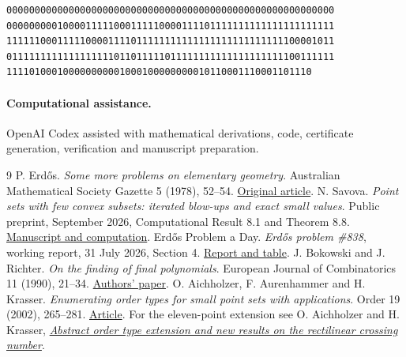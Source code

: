 \documentclass[11pt]{article}
\begin{document}
{\small\begin{verbatim}
0000000000000000000000000000000000000000000000000000000000
0000000001000011111000111110000111101111111111111111111111
1111110001111100001111011111111111111111111111111100001011
0111111111111111111011011111011111111111111111111100111111
111101000100000000001000100000000010110001110001101110
\end{verbatim}}
\paragraph{Computational assistance.} OpenAI Codex assisted with mathematical derivations, code, certificate generation, verification and manuscript preparation.
\begin{thebibliography}{9}\small
{} P. Erd\H{o}s. \emph{Some more problems on elementary geometry}. Australian Mathematical Society Gazette 5 (1978), 52--54. \href{https://users.renyi.hu/~p_erdos/1978-44.pdf}{Original article}.
 N. Savova. \emph{Point sets with few convex subsets: iterated blow-ups and exact small values}. Public preprint, September 2026, Computational Result 8.1 and Theorem 8.8. \href{https://github.com/NikolSavova/erdos-838-convex-subsets}{Manuscript and computation}.
 Erd\H{o}s Problem a Day. \emph{Erd\H{o}s problem \#838}, working report, 31 July 2026, Section 4. \href{https://www.erdosproblemaday.com/report/838}{Report and table}.
 J. Bokowski and J. Richter. \emph{On the finding of final polynomials}. European Journal of Combinatorics 11 (1990), 21--34. \href{https://science-to-touch.com/Articles/jrg/05_BFP.pdf}{Authors' paper}.
 O. Aichholzer, F. Aurenhammer and H. Krasser. \emph{Enumerating order types for small point sets with applications}. Order 19 (2002), 265--281. \href{https://doi.org/10.1023/A:1021231927255}{Article}. For the eleven-point extension see O. Aichholzer and H. Krasser, \href{https://publications.ist.tugraz.at/abstracts/ak-aoten-05b/index.html}{\emph{Abstract order type extension and new results on the rectilinear crossing number}}.
\end{thebibliography}
\end{document}
